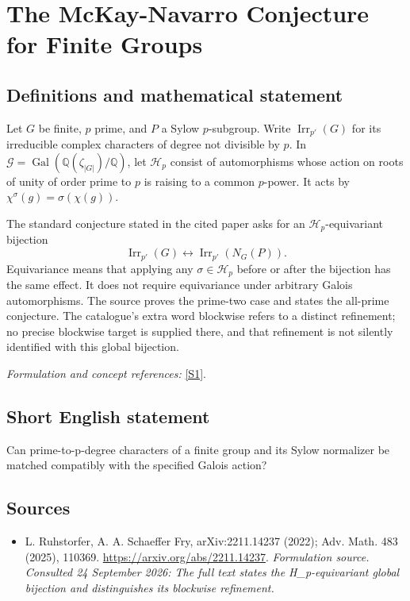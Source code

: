 \documentclass[11pt]{article}
\begin{document}
\section*{\texorpdfstring{The McKay-Navarro Conjecture for Finite Groups}{The McKay-Navarro Conjecture for Finite Groups}}\label{30006971}
\subsection{Definitions and mathematical statement}
Let $G$ be finite, $p$ prime, and $P$ a Sylow $p$-subgroup. Write $\operatorname{Irr}_{p'}(G)$ for its irreducible complex characters of degree not divisible by $p$. In $\mathcal G=\operatorname{Gal}({\mathbb{Q}}(\zeta_{|G|})/{\mathbb{Q}})$, let $\mathcal H_p$ consist of automorphisms whose action on roots of unity of order prime to $p$ is raising to a common $p$-power. It acts by $\chi^\sigma(g)=\sigma(\chi(g))$.

The standard conjecture stated in the cited paper asks for an $\mathcal H_p$-equivariant bijection
\[
 \operatorname{Irr}_{p'}(G)\longleftrightarrow
 \operatorname{Irr}_{p'}(N_G(P)).
\]
Equivariance means that applying any $\sigma\in\mathcal H_p$ before or after the bijection has the same effect. It does not require equivariance under arbitrary Galois automorphisms. The source proves the prime-two case and states the all-prime conjecture. The catalogue's extra word blockwise refers to a distinct refinement; no precise blockwise target is supplied there, and that refinement is not silently identified with this global bijection.
\par\smallskip\textit{Formulation and concept references:} \href{https://arxiv.org/abs/2211.14237}{[S1]}.

\subsection{Short English statement}
Can prime-to-p-degree characters of a finite group and its Sylow normalizer be matched compatibly with the specified Galois action?
\subsection{Sources}
\begin{itemize}
\item[S1]L. Ruhstorfer, A. A. Schaeffer Fry, arXiv:2211.14237 (2022); Adv. Math. 483 (2025), 110369.
\url{https://arxiv.org/abs/2211.14237}.
\textit{Formulation source. Consulted 24 September 2026: The full text states the H\_p-equivariant global bijection and distinguishes its blockwise refinement.}
\end{itemize}
\end{document}
